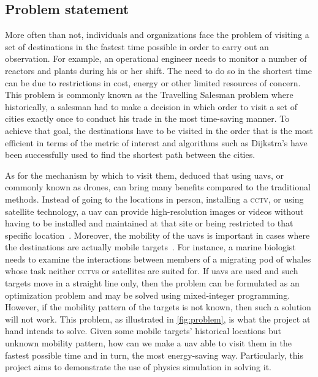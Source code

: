 \documentclass[../main.tex]{subfiles}
\begin{document}
\subsection{Problem statement}

More often than not, individuals and organizations face the problem
of visiting a set of destinations in the fastest time possible
in order to carry out an observation.
For example, an operational engineer needs to monitor
a number of reactors and plants during his or her shift.
The need to do so in the shortest time can be due to restrictions in
cost, energy or other limited resources of concern.
This problem is commonly known as the Travelling Salesman problem
where historically, a salesman had to make a decision in which order
to visit a set of cities exactly once to conduct his trade
in the most time-saving manner.
To achieve that goal, the destinations have to be visited in the order
that is the most efficient in terms of the metric of interest
and algorithms such as Dijkstra's have been successfully used 
to find the shortest path between the cities.

As for the mechanism by which to visit them, 
\textcite{Sha19} deduced that using \glspl{uav}, 
or commonly known as drones,
can bring many benefits 
compared to the traditional methods.
Instead of going to the locations in person, installing a \textsc{cctv},
or using satellite technology, a \gls{uav} can provide
high-resolution images or videos without 
having to be installed and maintained at that site
or being restricted to that specific location~\cite{Sha19}.
Moreover, the mobility of the \glspl{uav} is important
in cases where the destinations are actually mobile targets~\cite{Sha19}.
For instance, a marine biologist needs to examine 
the interactions between members of a migrating 
pod of whales whose task neither \textsc{cctv}s 
or satellites are suited for.
If \glspl{uav} are used and such targets move 
in a straight line only,
then the problem can be formulated as 
an optimization problem
and may be solved using mixed-integer programming.
However, if the mobility pattern of the targets is not known,
then such a solution will not work.
This problem, as illustrated in \cref{fig:problem}, 
is what the project at hand intends to solve.
Given some mobile targets' historical locations 
but unknown mobility pattern,
how can we make a \gls{uav} able to visit them
in the fastest possible time and in turn, the most energy-saving way. 
Particularly, this project aims to demonstrate the 
use of physics simulation in solving it. 
\end{document}
